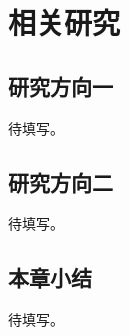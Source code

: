 \makeatletter
\@startondoublepagefalse %
\makeatother

\chapter{相关研究}

\section{研究方向一}
待填写。

\section{研究方向二}
待填写。

\section{本章小结}
待填写。
